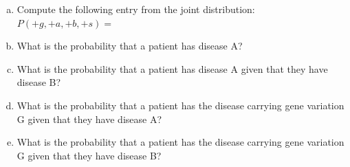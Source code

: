 \documentclass[a4paper]{article}
\newcommand\independent{\perp \!\!\! \perp}
\newif\ifsol
\begin{document}
    \begin{enumerate}[a)]
        \item  Compute the following entry from the joint distribution: $P(+g, +a, +b, +s) =$\\
        \ifsol {\color{blue} $P(+g)P(+a| + g)P(+b)P(+s| + b, +a) = (0.1)(1.0)(0.4)(1.0) = 0.04$} \bigskip 
        \else \bigskip \bigskip \bigskip
        \fi
        
        \item  What is the probability that a patient has disease A?\\
        \ifsol {\color{blue} $P(+a) = P(+a| + g)P(+g) + P(+a| − g)P(−g) = (1.0)(0.1) + (0.1)(0.9) = 0.19$} \bigskip 
        \else \bigskip \bigskip \bigskip
        \fi
        
        \item  What is the probability that a patient has disease A given that they have disease B?\\
        \ifsol {\color{blue} $P(+a| + b) = P(+a) = 0.19.$ The first equality holds true as we have $A \independent B$, which can be inferred from the graph of the Bayes’ net.} \bigskip 
        \else \bigskip \bigskip \bigskip
        \fi
        
        \item What is the probability that a patient has the disease carrying gene variation G given that they have disease A? \\
        \ifsol {\color{blue} $P(+g| + a) = \frac{P(+g)P(+a|+g)}{P(+g)P(+a|+g)+P(−g)P(+a|−g)} = \frac{(0.1)(1.0)}{(0.1)(1.0)+(0.9)(0.1)} = \frac{0.1}{0.1+0.09} = 0.5263.$} \bigskip 
        \else \bigskip \bigskip \bigskip
        \fi
        
        \item What is the probability that a patient has the disease carrying gene variation G given that they have disease B?\\
        \ifsol {\color{blue} $P(+g| + b) = P(+g) = 0.1$ The first equality holds true as we have $G \independent B$, which can be inferred from the graph of the Bayes’ net.} \bigskip 
        \else \bigskip \bigskip \bigskip
        \fi
    \end{enumerate}
    
\end{document}
